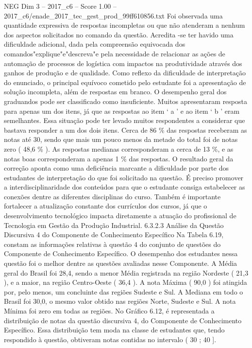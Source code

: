\begin{textsample}{NEG Dim 3 – 2017\_c6 – Score 1.00 – 2017\_c6/enade\_2017\_tec\_gest\_prod\_99ff610856.txt}
Foi observada uma quantidade expressiva de respostas incompletas ou que não atenderam a nenhum dos aspectos solicitados no comando da questão.
Acredita -se ter havido uma dificuldade adicional, dada pela compreensão equivocada dos comandos"explique"e"descreva"e pela necessidade de relacionar as ações de automação de processos de logística com impactos na produtividade através dos ganhos de produção e de qualidade.
Como reflexo da dificuldade de interpretação do enunciado, o principal equívoco cometido pelo estudante foi a apresentação de solução incompleta, além de respostas em branco.
O desempenho geral dos graduandos pode ser classificado como insuficiente.
Muitos apresentaram resposta para apenas um dos itens, já que as respostas ao item ‘ a ’ e ao item ‘ b ’ eram semelhantes.
Essa situação pode ter levado muitos respondentes a considerar que bastava responder a um dos dois itens.
Cerca de 86 \% das respostas receberam as notas até 30, sendo que mais um pouco menos da metade do total foi de notas zero ( 48,6 \% ).
As respostas medianas corresponderam a cerca de 13 \%, e as notas boas corresponderam a apenas 1 \% das respostas.
O resultado geral da correção aponta como uma deficiência marcante a dificuldade por parte dos estudantes de interpretação do que foi solicitado na questão.
É preciso promover a interdisciplinaridade dos conteúdos para que o estudante consiga estabelecer as conexões dentre as diferentes disciplinas do curso.
Também é importante fortalecer a atualização constante dos currículos dos cursos, já que o desenvolvimento tecnológico impacta diretamente a atuação do profissional de Tecnologia em Gestão da Produção Industrial. 6.3.2.3 Análise da Questão Discursiva 4 do Componente de Conhecimento Específico Na Tabela 6.19, constam as informações relativas à questão 4 do conjunto de questões do Componente de Conhecimento Específico.
O desempenho dos estudantes nessa questão foi o melhor dentre as questões avaliadas nesse Componente.
A Média geral do Brasil foi 28,4, sendo a menor Média registrada na região Nordeste ( 21,3 ), e a maior, na região Centro-Oeste ( 36,4 ).
A nota Máxima ( 90,0 ) foi atingida por, pelo menos, um concluinte das regiões Sudeste e Sul.
A Mediana em todo o Brasil foi 30,0, o mesmo valor obtido nas regiões Norte, Sudeste e Sul.
A nota Mínima foi zero em todas as regiões.
No Gráfico 6.12, é representada a distribuição de notas da questão discursiva 4, do Componente de Conhecimento Específico.
Essa distribuição tem moda na classe de estudantes que, tendo respondido à questão, obtiveram notas contidas no intervalo ( 30 ; 40 ].

\end{textsample}
